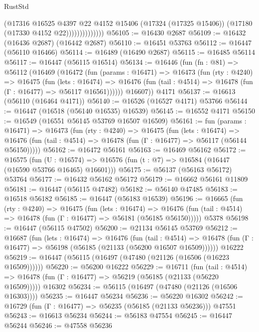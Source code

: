 \begin{lexlean}{RustStd}
\begin{coremodule}
                          (@17316
                            @16525
                            @4397
                            @22
                            @4152
                            @15406
                            (@17324 (@17325 @15406))
                            (@17180 (@17330 @4152 @22))))))))))))))
@56105 := @16430 @2687
@56109 := @16432 (@16436 @2687) (@16442 @2687)
@56110 := @16451 @53763
@56112 := @16447 (@56110 @16466)
@56114 := @16489 (@16490 @2687)
@56115 := @16485 @56114
@56117 := @16447 (@56115 @16514)
@56134 := @16446
    (fun (fn : @81) =>
    @56112
      (@16469
        (@16472
          (fun (params : @16471) =>
          @16473
            (fun (rty : @4240) =>
            @16475
              (fun (lets : @16474) =>
              @16476 (fun (tail : @4514) => @16478 (fun (Γ : @16477) => @56117 @16561))))))
        @16607))
    @4171
@56137 := @16613 (@56110 (@16464 @4171))
@56140 := @16526 (@16527 @4171) @53766
@56144 := @16447 (@16518 (@56140 @16535) @16539)
@56145 := @16552 @4171
@56150 := @16549 (@16551 @56145 @53769 @16507 @16509)
@56161 := fun (params : @16471) =>
  @16473
    (fun (rty : @4240) =>
    @16475
      (fun (lets : @16474) =>
      @16476 (fun (tail : @4514) => @16478 (fun (Γ : @16477) => @56117 (@56144 @56150)))))
@56162 := @16472 @56161
@56163 := @16469 @56162
@56172 := @16575
    (fun (U : @16574) => @16576 (fun (t : @7) => @16584 (@16447 (@16590 @53766 @16465) @16601)))
@56175 := @56137 (@56163 @56172) @53764
@56177 := @16432 @56162 @56172
@56179 := @16662 @56161 @11809
@56181 := @16447 (@56115 @47482)
@56182 := @56140 @47485
@56183 := @16518 @56182
@56185 := @16447 (@56183 @16539)
@56196 := @16665
    (fun (rty : @4240) =>
    @16475
      (fun (lets : @16474) =>
      @16476 (fun (tail : @4514) => @16478 (fun (Γ : @16477) => @56181 (@56185 @56150)))))
    @5378
@56198 := @16447 (@56115 @47502)
@56200 := @21134 @56145 @53769
@56212 := @16687
    (fun (lets : @16474) =>
    @16476
      (fun (tail : @4514) =>
      @16478 (fun (Γ : @16477) => @56198 (@56185 (@21133 (@56200 @16507 @16509))))))
    @16222
@56219 := @16447 (@56115 (@16497 (@47480 (@21126 (@16506 (@16223 @16509))))))
@56220 := @56200 @16222
@56229 := @16711
    (fun (tail : @4514) => @16478 (fun (Γ : @16477) => @56219 (@56185 (@21133 (@56220 @16509)))))
    @16302
@56234 := @56115 (@16497 (@47480 (@21126 (@16506 @16303))))
@56235 := @16447 @56234
@56236 := @56220 @16302
@56242 := @16729 (fun (Γ : @16477) => @56235 (@56185 (@21133 @56236))) @47551
@56243 := @16613 @56234
@56244 := @56183 @47554
@56245 := @16447 @56244
@56246 := @47558 @56236

\end{coremodule}
\end{lexlean}
